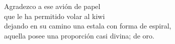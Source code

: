 \cleardoublepage
{}
{}
\begin{flushleft}
Agradezco a ese avión de papel\\
que le ha permitido volar al kiwi\\
dejando en su camino una estala con forma de espiral,\\
aquella posee una proporción casi divina; de oro.
\end{flushleft}

\newpage